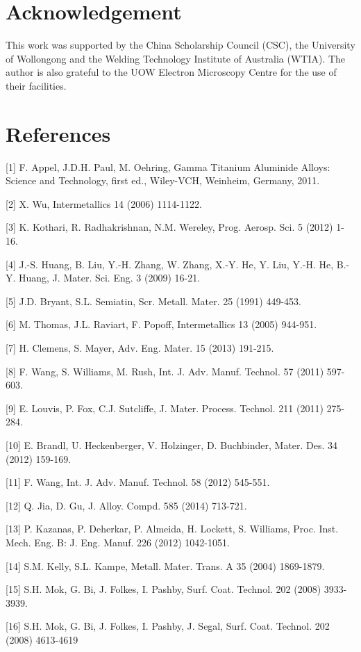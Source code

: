 \documentclass[10pt]{article}
\begin{document}
\section*{Acknowledgement}
This work was supported by the China Scholarship Council (CSC), the University of Wollongong and the Welding Technology Institute of Australia (WTIA). The author is also grateful to the UOW Electron Microscopy Centre for the use of their facilities.

\section*{References}
[1] F. Appel, J.D.H. Paul, M. Oehring, Gamma Titanium Aluminide Alloys: Science and Technology, first ed., Wiley-VCH, Weinheim, Germany, 2011.

[2] X. Wu, Intermetallics 14 (2006) 1114-1122.

[3] K. Kothari, R. Radhakrishnan, N.M. Wereley, Prog. Aerosp. Sci. 5 (2012) 1-16.

[4] J.-S. Huang, B. Liu, Y.-H. Zhang, W. Zhang, X.-Y. He, Y. Liu, Y.-H. He, B.-Y. Huang, J. Mater. Sci. Eng. 3 (2009) 16-21.

[5] J.D. Bryant, S.L. Semiatin, Scr. Metall. Mater. 25 (1991) 449-453.

[6] M. Thomas, J.L. Raviart, F. Popoff, Intermetallics 13 (2005) 944-951.

[7] H. Clemens, S. Mayer, Adv. Eng. Mater. 15 (2013) 191-215.

[8] F. Wang, S. Williams, M. Rush, Int. J. Adv. Manuf. Technol. 57 (2011) 597-603.

[9] E. Louvis, P. Fox, C.J. Sutcliffe, J. Mater. Process. Technol. 211 (2011) 275-284.

[10] E. Brandl, U. Heckenberger, V. Holzinger, D. Buchbinder, Mater. Des. 34 (2012) 159-169.

[11] F. Wang, Int. J. Adv. Manuf. Technol. 58 (2012) 545-551.

[12] Q. Jia, D. Gu, J. Alloy. Compd. 585 (2014) 713-721.

[13] P. Kazanas, P. Deherkar, P. Almeida, H. Lockett, S. Williams, Proc. Inst. Mech. Eng. B: J. Eng. Manuf. 226 (2012) 1042-1051.

[14] S.M. Kelly, S.L. Kampe, Metall. Mater. Trans. A 35 (2004) 1869-1879.

[15] S.H. Mok, G. Bi, J. Folkes, I. Pashby, Surf. Coat. Technol. 202 (2008) 3933-3939.

[16] S.H. Mok, G. Bi, J. Folkes, I. Pashby, J. Segal, Surf. Coat. Technol. 202 (2008) 4613-4619
\end{document}
